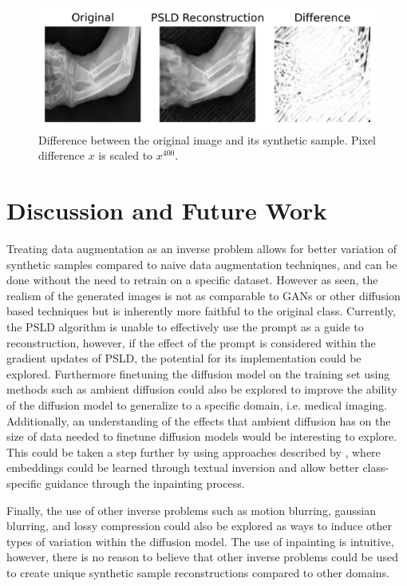 \documentclass{article}
\begin{document}
\begin{figure}[ht]
    \vskip -0.1in
    \begin{center}
        \centerline{\includegraphics[width=\columnwidth]{difference.png}}
        \caption{Difference between the original image and its synthetic sample. Pixel difference $x$ is scaled to $x^{400}$.}
        \label{difference}
    \end{center}
    \vskip -0.3in
\end{figure}

\section{Discussion and Future Work}

Treating data augmentation as an inverse problem allows for better variation of synthetic samples compared to naive data augmentation techniques, and can be done
without the need to retrain on a specific dataset. However as seen, the realism of the generated images is not as comparable to GANs or other diffusion based techniques
but is inherently more faithful to the original class. Currently, the PSLD algorithm is unable to effectively use the prompt as a guide to reconstruction, however, if the 
effect of the prompt is considered within the gradient updates of PSLD, the potential for its implementation could be explored. Furthermore finetuning the diffusion model on
the training set using methods such as ambient diffusion \cite{2305.19256} could also be explored to improve the ability of the diffusion model to generalize to 
a specific domain, i.e. medical imaging. Additionally, an understanding of the effects that ambient diffusion has on the size of data needed to finetune diffusion models
would be interesting to explore. This could be taken a step further by using approaches described by \cite{2302.07944}, where embeddings could be learned through
textual inversion and allow better class-specific guidance through the inpainting process. 

Finally, the use of other inverse problems such as motion blurring, gaussian blurring, and lossy compression could also be explored as ways to induce other types of variation
within the diffusion model. The use of inpainting is intuitive, however, there is no reason to believe that other inverse problems could be used to create unique synthetic
sample reconstructions compared to other domains. 
\end{document}

